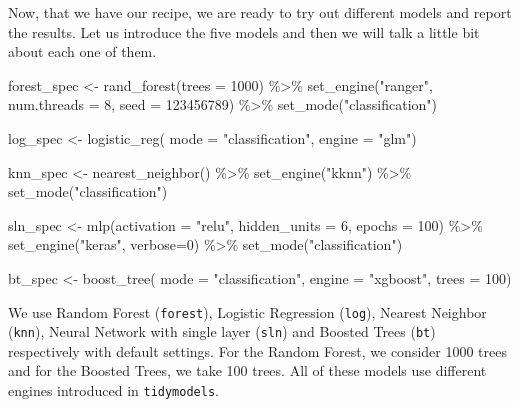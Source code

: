 \documentclass[
]{article}
\newenvironment{Shaded}{\begin{snugshade}}{\end{snugshade}}
\newcommand{\AttributeTok}[1]{\textcolor[rgb]{0.77,0.63,0.00}{#1}}
\newcommand{\DecValTok}[1]{\textcolor[rgb]{0.00,0.00,0.81}{#1}}
\newcommand{\FunctionTok}[1]{\textcolor[rgb]{0.00,0.00,0.00}{#1}}
\newcommand{\NormalTok}[1]{#1}
\newcommand{\OtherTok}[1]{\textcolor[rgb]{0.56,0.35,0.01}{#1}}
\newcommand{\SpecialCharTok}[1]{\textcolor[rgb]{0.00,0.00,0.00}{#1}}
\newcommand{\StringTok}[1]{\textcolor[rgb]{0.31,0.60,0.02}{#1}}
\begin{document}
Now, that we have our recipe, we are ready to try out different models
and report the results. Let us introduce the five models and then we
will talk a little bit about each one of them.

\begin{Shaded}
\begin{Highlighting}[]
\NormalTok{forest\_spec }\OtherTok{\textless{}{-}}
  \FunctionTok{rand\_forest}\NormalTok{(}\AttributeTok{trees =} \DecValTok{1000}\NormalTok{) }\SpecialCharTok{\%\textgreater{}\%}
  \FunctionTok{set\_engine}\NormalTok{(}\StringTok{"ranger"}\NormalTok{, }\AttributeTok{num.threads =} \DecValTok{8}\NormalTok{, }\AttributeTok{seed =} \DecValTok{123456789}\NormalTok{) }\SpecialCharTok{\%\textgreater{}\%}
  \FunctionTok{set\_mode}\NormalTok{(}\StringTok{"classification"}\NormalTok{)}

\NormalTok{log\_spec }\OtherTok{\textless{}{-}}
  \FunctionTok{logistic\_reg}\NormalTok{(}
  \AttributeTok{mode =} \StringTok{"classification"}\NormalTok{,}
  \AttributeTok{engine =} \StringTok{"glm"}\NormalTok{)}

\NormalTok{knn\_spec }\OtherTok{\textless{}{-}}
  \FunctionTok{nearest\_neighbor}\NormalTok{() }\SpecialCharTok{\%\textgreater{}\%}
  \FunctionTok{set\_engine}\NormalTok{(}\StringTok{"kknn"}\NormalTok{) }\SpecialCharTok{\%\textgreater{}\%}
  \FunctionTok{set\_mode}\NormalTok{(}\StringTok{"classification"}\NormalTok{)}

\NormalTok{sln\_spec }\OtherTok{\textless{}{-}}
  \FunctionTok{mlp}\NormalTok{(}\AttributeTok{activation =} \StringTok{"relu"}\NormalTok{, }\AttributeTok{hidden\_units =} \DecValTok{6}\NormalTok{, }\AttributeTok{epochs =} \DecValTok{100}\NormalTok{) }\SpecialCharTok{\%\textgreater{}\%}
  \FunctionTok{set\_engine}\NormalTok{(}\StringTok{"keras"}\NormalTok{, }\AttributeTok{verbose=}\DecValTok{0}\NormalTok{) }\SpecialCharTok{\%\textgreater{}\%}
  \FunctionTok{set\_mode}\NormalTok{(}\StringTok{"classification"}\NormalTok{)}


\NormalTok{bt\_spec }\OtherTok{\textless{}{-}} \FunctionTok{boost\_tree}\NormalTok{(}
  \AttributeTok{mode =} \StringTok{"classification"}\NormalTok{,}
  \AttributeTok{engine =} \StringTok{"xgboost"}\NormalTok{,}
  \AttributeTok{trees =} \DecValTok{100}\NormalTok{)}
\end{Highlighting}
\end{Shaded}

We use Random Forest (\texttt{forest}), Logistic Regression
(\texttt{log}), Nearest Neighbor (\texttt{knn}), Neural Network with
single layer (\texttt{sln}) and Boosted Trees (\texttt{bt}) respectively
with default settings. For the Random Forest, we consider 1000 trees and
for the Boosted Trees, we take 100 trees. All of these models use
different engines introduced in \texttt{tidymodels}.
\end{document}
